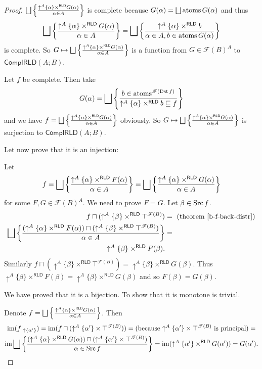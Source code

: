 \begin{proof}
$\bigsqcup\left\{ \frac{\uparrow^{A}\{\alpha\}\times^{\mathsf{RLD}}G(\alpha)}{\alpha\in A}\right\}$
is complete because $G(\alpha)=\bigsqcup\operatorname{atoms} G(\alpha)$ and thus
\[
\bigsqcup\left\{ \frac{\uparrow^{A}\{\alpha\}\times^{\mathsf{RLD}}G(\alpha)}{\alpha\in A}\right\}=\bigsqcup\left\{ \frac{\uparrow^{A}\{\alpha\}\times^{\mathsf{RLD}}b}{\alpha\in A,b\in\operatorname{atoms} G(\alpha)}\right\}
\]
is complete. So $G\mapsto\bigsqcup\left\{ \frac{\uparrow^{A}\{\alpha\}\times^{\mathsf{RLD}}G(\alpha)}{\alpha\in A}\right\}$
is a function from $G\in\mathscr{F}(B)^{A}$ to $\mathsf{ComplRLD}(A;B)$.

Let $f$ be complete. Then take
\[
G(\alpha)=\bigsqcup\left\{ \frac{b\in\operatorname{atoms}^{\mathscr{F}(\operatorname{Dst} f)}}{\uparrow^{A}\{\alpha\}\times^{\mathsf{RLD}}b\sqsubseteq f}\right\}
\]
and we have $f=\bigsqcup\left\{ \frac{\uparrow^{A}\{\alpha\}\times^{\mathsf{RLD}}G(\alpha)}{\alpha\in A}\right\}$
obviously. So $G\mapsto\bigsqcup\left\{ \frac{\uparrow^{A}\{\alpha\}\times^{\mathsf{RLD}}G(\alpha)}{\alpha\in A}\right\}$
is surjection to $\mathsf{ComplRLD}(A;B)$.

Let now prove that it is an injection:

Let
\[
f=\bigsqcup\left\{ \frac{\uparrow^{A}\{\alpha\}\times^{\mathsf{RLD}}F(\alpha)}{\alpha\in A}\right\}=\bigsqcup\left\{ \frac{\uparrow^{A}\{\alpha\}\times^{\mathsf{RLD}}G(\alpha)}{\alpha\in A}\right\}
\]
for some $F,G\in\mathscr{F}(B)^{A}$. We need to prove $F=G$. Let
$\beta\in\operatorname{Src} f$.
\begin{align*}
f\sqcap(\uparrow^{A}\{\beta\}\times^{\mathsf{RLD}}\top^{\mathscr{F}(B)}) & =\text{ (theorem~\ref{b-f-back-distr})}\\
\bigsqcup\left\{ \frac{(\uparrow^{A}\{\alpha\}\times^{\mathsf{RLD}}F(\alpha))\sqcap(\uparrow^{A}\{\beta\}\times^{\mathsf{RLD}}\top^{\mathscr{F}(B)})}{\alpha\in A}\right\} & =\\
\uparrow^{A}\{\beta\}\times^{\mathsf{RLD}}F(\beta).
\end{align*}
Similarly $f\sqcap(\uparrow^{A}\{\beta\}\times^{\mathsf{RLD}}\top^{\mathscr{F}(B)})=\uparrow^{A}\{\beta\}\times^{\mathsf{RLD}}G(\beta)$.
Thus $\uparrow^{A}\{\beta\}\times^{\mathsf{RLD}}F(\beta)=\uparrow^{A}\{\beta\}\times^{\mathsf{RLD}}G(\beta)$
and so $F(\beta)=G(\beta)$.

We have proved that it is a bijection. To show that it is monotone
is trivial.

Denote $f=\bigsqcup\left\{ \frac{\uparrow^{A}\{\alpha\}\times^{\mathsf{RLD}}G(\alpha)}{\alpha\in A}\right\}$.
Then
\begin{multline*}
\operatorname{im}(f|_{\uparrow \{\alpha'\}})=\operatorname{im}(f\sqcap(\uparrow^{A}\{\alpha'\}\times\top^{\mathscr{T}(B)}))=\text{(because \ensuremath{\uparrow^{A}\{\alpha'\}\times\top^{\mathscr{T}(B)}} is principal)}=\\
\operatorname{im}\bigsqcup\left\{ \frac{(\uparrow^{A}\{\alpha\}\times^{\mathsf{RLD}}G(\alpha))\sqcap(\uparrow^{A}\{\alpha'\}\times\top^{\mathscr{T}(B)})}{\alpha\in\operatorname{Src} f}\right\}=\operatorname{im}(\uparrow^{A}\{\alpha'\}\times^{\mathsf{RLD}}G(\alpha'))=G(\alpha').
\end{multline*}
\end{proof}
